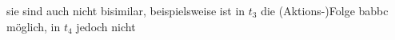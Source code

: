 sie sind auch nicht bisimilar, beispielsweise ist in $t_3$ die  (Aktions-)Folge babbc möglich, in $t_4$ jedoch nicht 